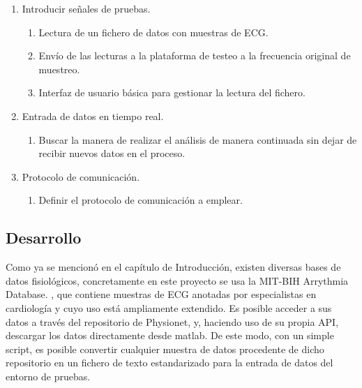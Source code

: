         \begin{enumerate}
                \item Introducir señales de pruebas.
                \begin{enumerate}
                        \item Lectura de un fichero de datos con muestras de ECG.
                        \item Envío de las lecturas a la plataforma de testeo a la frecuencia original de muestreo.
                        \item Interfaz de usuario básica para gestionar la lectura del fichero.
                \end{enumerate}
                \item Entrada de datos en tiempo real.
                \begin{enumerate}
                        \item Buscar la manera de realizar el análisis de manera continuada sin dejar de recibir nuevos datos en el proceso.
                \end{enumerate}
                \item Protocolo de comunicación.
                \begin{enumerate}
                        \item Definir el protocolo de comunicación a emplear.
                \end{enumerate}
        \end{enumerate}

    \subsection{Desarrollo}

        Como ya se mencionó en el capítulo de Introducción, existen diversas bases de datos fisiológicos, concretamente en este proyecto se usa la MIT-BIH Arrythmia Database. \cite{MIT-BIH}, que contiene  muestras de ECG anotadas por especialistas en cardiología y cuyo uso está ampliamente extendido.   Es posible acceder a sus datos a través del repositorio de Physionet, y, haciendo uso de su propia API, descargar los datos directamente desde matlab.\cite{phisionet} De este modo, con un simple script, es posible convertir cualquier muestra de datos procedente de dicho repositorio en un fichero de texto estandarizado para la entrada de datos del entorno de pruebas.
        

